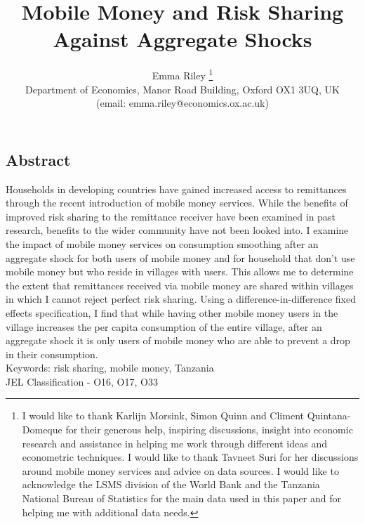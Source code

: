 \documentclass[a4paper]{article}
\begin{document}
\begin{titlepage}
\title{Mobile Money and Risk Sharing Against Aggregate Shocks}
\author{Emma Riley \footnote{I would like to thank  Karlijn Morsink, Simon Quinn and Climent Quintana-Domeque for their generous help, inspiring discussions, insight into economic research and assistance in helping me work through different ideas and econometric techniques. I would like to thank Tavneet Suri for her discussions around mobile money services and advice on data sources. I would like to acknowledge the LSMS division of the World Bank and the Tanzania National Bureau of Statistics for the main data used in this paper and for helping me with additional data needs.} \\ Department of Economics, Manor Road Building, Oxford OX1 3UQ, UK \\ (email: emma.riley@economics.ox.ac.uk)}
\thispagestyle{empty}
\maketitle 
\begin{center}
\section*{Abstract}
\end{center}
Households in developing countries have gained increased access to remittances through the recent introduction of mobile money services. While the benefits of improved risk sharing to the remittance receiver have been examined in past research, benefits to the wider community have not been looked into. I examine the impact of mobile money services on consumption smoothing after an aggregate shock for both users of mobile money and for household that don't use mobile money but who reside in villages with users. This allows me to determine the extent that remittances received via mobile money are shared within villages in which I cannot reject perfect risk sharing. Using a difference-in-difference fixed effects specification, I find that while having other mobile money users in the village increases the per capita consumption of the entire village, after an aggregate shock it is only users of mobile money who are able to prevent a drop in their consumption.  \\

\noindent Keywords: risk sharing, mobile money, Tanzania \\
JEL Classification - O16, O17, O33
\thispagestyle{empty}



\end{titlepage}
\end{document}
